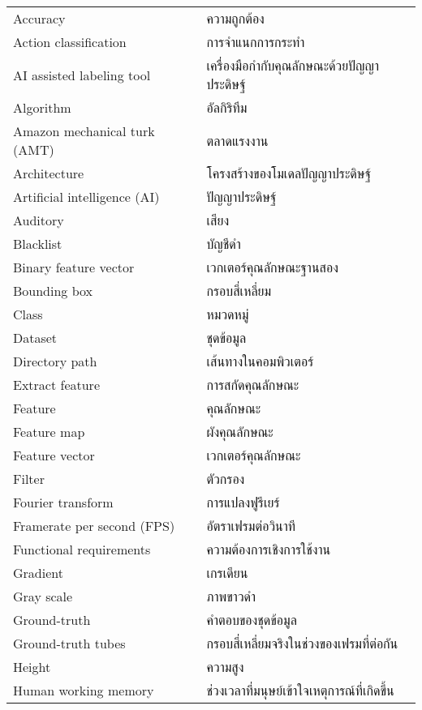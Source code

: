 \begin{abbreviations}
    \noindent
    \begin{tabular*}{\textwidth}{@{}p{}p{}@{}}
	Accuracy     &   ความถูกต้อง\\
        Action classification  &  การจำแนกการกระทำ\\
        AI assisted labeling tool  &   เครื่องมือกำกับคุณลักษณะด้วยปัญญาประดิษฐ์\\
	Algorithm   &     อัลกิริทึม\\
        Amazon mechanical turk (AMT) & ตลาดแรงงาน\\
	Architecture  &  โครงสร้างของโมเดลปัญญาประดิษฐ์\\
	Artificial intelligence (AI) &           ปัญญาประดิษฐ์\\
        Auditory  &      เสียง\\
	Blacklist    &    บัญชีดำ\\
        Binary feature vector & เวกเตอร์คุณลักษณะฐานสอง\\
	Bounding box  &  กรอบสี่เหลี่ยม\\
        Class        &    หมวดหมู่\\
        Dataset   &      ชุดข้อมูล\\
	Directory path &   เส้นทางในคอมพิวเตอร์\\
        Extract feature & การสกัดคุณลักษณะ \\
        Feature     &    คุณลักษณะ\\
        Feature map  &  ผังคุณลักษณะ\\
        Feature vector  &  เวกเตอร์คุณลักษณะ\\
        Filter & ตัวกรอง\\
        Fourier transform &  การแปลงฟูรีเยร์\\
        Framerate per second (FPS) & อัตราเฟรมต่อวินาที \\
        Functional requirements & ความต้องการเชิงการใช้งาน\\
        Gradient    &    เกรเดียน\\
        Gray scale     &   ภาพขาวดำ\\
        Ground-truth &   คำตอบของชุดข้อมูล\\        
	Ground-truth tubes & กรอบสี่เหลี่ยมจริงในช่วงของเฟรมที่ต่อกัน\\
        Height     &   ความสูง\\
	Human working memory & ช่วงเวลาที่มนุษย์เข้าใจเหตุการณ์ที่เกิดขึ้น\\

\end{tabular*}
\end{abbreviations}
